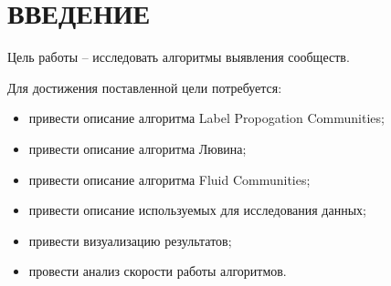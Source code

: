 \section*{ВВЕДЕНИЕ}

Цель работы -- исследовать алгоритмы выявления сообществ.

Для достижения поставленной цели потребуется:
\begin{itemize}
	\item привести описание алгоритма Label Propogation Communities;
	\item привести описание алгоритма Лювина;
	\item привести описание алгоритма Fluid Communities;
	\item привести описание используемых для исследования данных;
	\item привести визуализацию результатов;
	\item провести анализ скорости работы алгоритмов.
\end{itemize}

\pagebreak